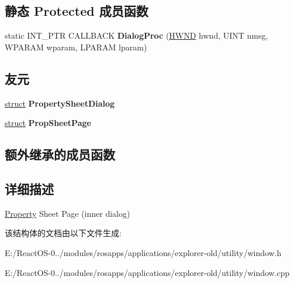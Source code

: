 \subsection*{静态 Protected 成员函数}
\begin{DoxyCompactItemize}
\item 
\mbox{\label{struct_prop_sheet_page_dlg_a825760afaec6cbeac876a487d56f89f3}} 
static I\+N\+T\+\_\+\+P\+TR C\+A\+L\+L\+B\+A\+CK {\bfseries Dialog\+Proc} (\hyperlink{interfacevoid}{H\+W\+ND} hwnd, U\+I\+NT nmsg, W\+P\+A\+R\+AM wparam, L\+P\+A\+R\+AM lparam)
\end{DoxyCompactItemize}
\subsection*{友元}
\begin{DoxyCompactItemize}
\item 
\mbox{\label{struct_prop_sheet_page_dlg_a5aca1e61e10d5d536319262cfaa1c9b8}} 
\hyperlink{interfacestruct}{struct} {\bfseries Property\+Sheet\+Dialog}
\item 
\mbox{\label{struct_prop_sheet_page_dlg_a44e435bd320f733d40dac69c554e8105}} 
\hyperlink{interfacestruct}{struct} {\bfseries Prop\+Sheet\+Page}
\end{DoxyCompactItemize}
\subsection*{额外继承的成员函数}


\subsection{详细描述}
\hyperlink{struct_property}{Property} Sheet Page (inner dialog) 

该结构体的文档由以下文件生成\+:\begin{DoxyCompactItemize}
\item 
E\+:/\+React\+O\+S-\/0../modules/rosapps/applications/explorer-\/old/utility/window.\+h\item 
E\+:/\+React\+O\+S-\/0../modules/rosapps/applications/explorer-\/old/utility/window.\+cpp\end{DoxyCompactItemize}
